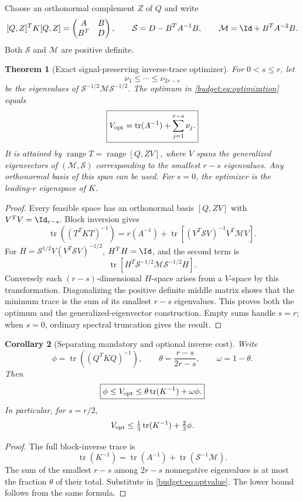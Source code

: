 \documentclass[11pt,oneside,openany,a4paper]{book}
\numberwithin{equation}{chapter}
\newtheorem{theorem}{Theorem}[chapter]
\newtheorem{corollary}[theorem]{Corollary}
\theoremstyle{definition}
\theoremstyle{remark}
\DeclareMathOperator{\tr}{tr}\DeclareMathOperator{\rank}{rank}
\DeclareMathOperator{\ran}{range}\DeclareMathOperator{\OPT}{OPT}
\begin{document}
Choose an orthonormal complement $Z$ of $Q$ and write
\[
 [Q,Z]^TK[Q,Z]=\begin{pmatrix}A&B\\B^T&D\end{pmatrix},\qquad
 \mathcal S=D-B^TA^{-1}B,\qquad
 \mathcal M=\Id+B^TA^{-2}B.
\]
Both $\mathcal S$ and $\mathcal M$ are positive definite.

\begin{theorem}[Exact signal-preserving inverse-trace optimizer]\label{budget:thm:completion}
For $0<s\le r$, let
\[
 \nu_1\le\cdots\le\nu_{2r-s}
\]
be the eigenvalues of $\mathcal S^{-1/2}\mathcal M\mathcal S^{-1/2}$. The optimum in \eqref{budget:eq:optimization} equals
\begin{equation}\label{budget:eq:optvalue}
 \boxed{V_{\rm opt}=\tr(A^{-1})+\sum_{j=1}^{r-s}\nu_j.}
\end{equation}
It is attained by $\ran T=\ran[Q,ZV]$, where $V$ spans the generalized eigenvectors of $(\mathcal M,\mathcal S)$ corresponding to the smallest $r-s$ eigenvalues. Any orthonormal basis of this span can be used. For $s=0$, the optimizer is the leading-$r$ eigenspace of $K$.
\end{theorem}
\begin{proof}
Every feasible space has an orthonormal basis $[Q,ZV]$ with $V^TV=\Id_{r-s}$. Block inversion gives
\begin{equation}\label{budget:eq:schurtrace}
 \tr((T^TKT)^{-1})=	r(A^{-1})+
 \tr\left[(V^T\mathcal S V)^{-1}V^T\mathcal M V\right].
\end{equation}
For $H=\mathcal S^{1/2}V(V^T\mathcal S V)^{-1/2}$, $H^TH=\Id$, and the second term is
\[
 \tr\left[H^T\mathcal S^{-1/2}\mathcal M\mathcal S^{-1/2}H\right].
\]
Conversely each $(r-s)$-dimensional $H$-space arises from a $V$-space by this transformation. Diagonalizing the positive definite middle matrix shows that the minimum trace is the sum of its smallest $r-s$ eigenvalues. This proves both the optimum and the generalized-eigenvector construction. Empty sums handle $s=r$; when $s=0$, ordinary spectral truncation gives the result.
\end{proof}

\begin{corollary}[Separating mandatory and optional inverse cost]\label{budget:cor:envelope}
Write
\[
 \phi=\tr((Q^TKQ)^{-1}),\qquad
 \theta=\frac{r-s}{2r-s},\qquad \omega=1-\theta.
\]
Then
\begin{equation}\label{budget:eq:envelope}
 \boxed{\phi\le V_{\rm opt}\le\theta\tr(K^{-1})+\omega\phi.}
\end{equation}
In particular, for $s=r/2$,
\begin{equation}\label{budget:eq:third}
 V_{\rm opt}\le\tfrac13\tr(K^{-1})+\tfrac23\phi.
\end{equation}
\end{corollary}
\begin{proof}
The full block-inverse trace is
\[
 \tr(K^{-1})=\tr(A^{-1})+\tr(\mathcal S^{-1}\mathcal M).
\]
The sum of the smallest $r-s$ among $2r-s$ nonnegative eigenvalues is at most the fraction $\theta$ of their total. Substitute in \eqref{budget:eq:optvalue}. The lower bound follows from the same formula.
\end{proof}
\end{document}
